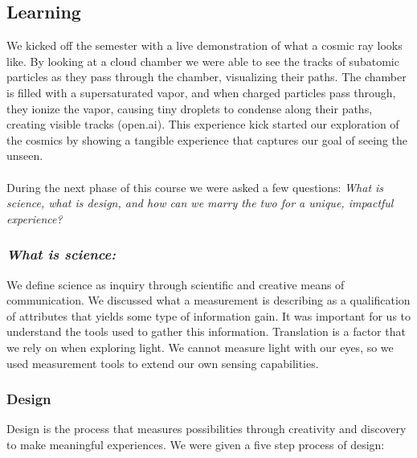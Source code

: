 \documentclass{article}
\begin{document}
\subsection{Learning}
We kicked off the semester with a live demonstration of what a cosmic ray looks like. By looking at a cloud chamber we were able to see  the tracks of subatomic particles as they pass through the chamber, visualizing their paths. The chamber is filled with a supersaturated vapor, and when charged 	
particles pass through, they ionize the vapor, causing tiny droplets to condense along their paths, creating visible tracks (open.ai). This experience kick started our exploration of the cosmics by showing a tangible experience that captures our goal of seeing the unseen. 
\\\\
During the next phase of this course we were asked a few questions: \textit{What is science, what is design, and how can we marry the two for a unique, impactful experience?}

\subsubsection{\textit{What is science:}}
We define science as inquiry through scientific and creative means of communication. We discussed what a measurement is describing as a qualification of attributes that yields some type of information gain. It was important for us to understand the tools used to gather this information. Translation is a factor that we rely on when exploring light. We cannot measure light with our eyes, so we used measurement tools to extend our own sensing capabilities. 

\subsubsection{Design}
Design is the process that measures possibilities through creativity and discovery to make meaningful experiences. We were given a five step process of design: 
\\
\end{document}
